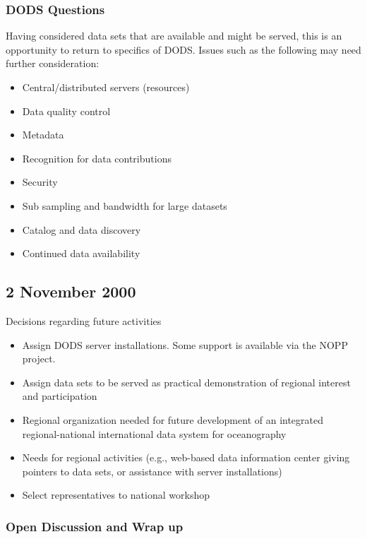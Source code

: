 \subsubsection{DODS Questions}
Having considered data sets that are available and might be served, this is an opportunity to 
return to specifics of DODS. Issues such as the following may need further consideration:

\begin{itemize}
\item Central/distributed servers (resources)
\item         Data quality control
\item         Metadata
\item         Recognition for data contributions
\item         Security
\item         Sub sampling and bandwidth for large datasets
\item         Catalog and data discovery
\item         Continued data availability
\end{itemize}

\subsection{2 November 2000}

Decisions regarding future activities

\begin{itemize}
\item     Assign DODS server installations. Some support is available via the NOPP project.
\item     Assign data sets to be served as practical demonstration of regional interest and participation
\item     Regional organization needed for future development of an integrated regional-national international data system for oceanography
\item     Needs for regional activities (e.g., web-based data information center giving pointers to data sets, or assistance with server installations)
\item     Select representatives to national workshop
\end{itemize}

\subsubsection{Open Discussion and Wrap up}

